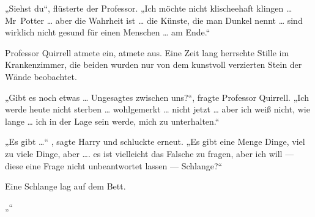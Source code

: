 „Siehst du“, flüsterte der Professor.
„Ich möchte nicht klischeehaft klingen … Mr~Potter … aber die Wahrheit ist … die Künste, die man Dunkel nennt … sind wirklich nicht gesund für einen Menschen … am Ende.“

Professor Quirrell atmete ein, atmete aus. Eine Zeit lang herrschte Stille im Krankenzimmer, die beiden wurden nur von dem kunstvoll verzierten Stein der Wände beobachtet.

„Gibt es noch etwas … Ungesagtes zwischen uns?“, fragte Professor Quirrell.
„Ich werde heute nicht sterben … wohlgemerkt … nicht jetzt … aber ich weiß nicht, wie lange … ich in der Lage sein werde, mich zu unterhalten.“

„Es gibt …“ , sagte Harry und schluckte erneut.
„Es gibt eine Menge Dinge, viel zu viele Dinge, aber …. es ist vielleicht das Falsche zu fragen, aber ich will — diese eine Frage nicht unbeantwortet lassen — Schlange?“

Eine Schlange lag auf dem Bett.

„“

